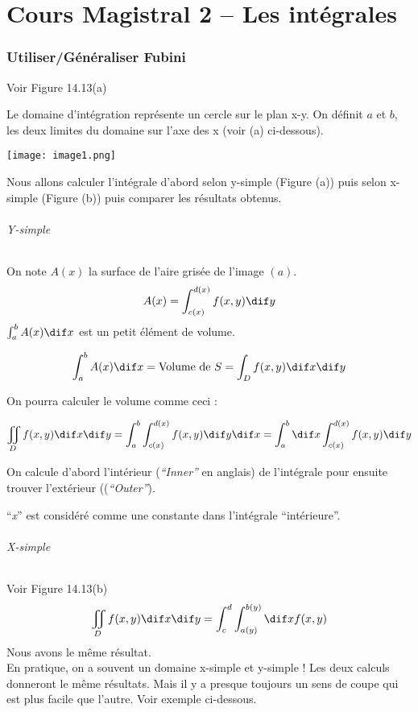 \part{Cours Magistral 2 -- Les intégrales}
\section{Utiliser/Généraliser Fubini}
Voir Figure 14.13(a)

Le domaine d'intégration représente un cercle sur le plan x-y. On définit $a$ et $b$, les deux limites du domaine sur l'axe des x (voir (a) ci-dessous).

\texttt{[image: image1.png]}

Nous allons calculer l'intégrale d'abord selon y-simple (Figure (a)) puis selon x-simple (Figure (b)) puis comparer les résultats obtenus.
\paragraph{Y-simple}
On note $A(x)$ la surface de l'aire grisée de l'image $(a)$.
\[A(x)=\int_{c(x)}^{d(x)}f(x,y)\dif y\]
$\int_a^b A(x) \dif x$ est un petit élément de volume.

\[\int_a^b A(x) \dif x = \text{Volume de }S = \int_Df(x,y) \dif x \dif y\]

On pourra calculer le volume comme ceci :

\[ \iint_D f(x,y) \dif x \dif y = \int_a^b \int_{c(x)}^{d(x)} f(x,y)  \dif y \dif x = \int_a^b \dif x \int_{c(x)}^{d(x)} f(x,y) \dif y \]

On calcule d'abord l'intérieur (\textit{``Inner''} en anglais) de l'intégrale pour ensuite trouver l'extérieur ((\textit{``Outer''}).
\begin{myrem}
``\emph{x}'' est considéré comme une constante dans l'intégrale ``intérieure''.
\end{myrem}

\paragraph{X-simple}

Voir Figure 14.13(b)
\[\iint_D f(x,y) \dif x \dif y = \int_c^d\int_{a(y)}^{b(y)} \dif x f(x,y)\]
Nous avons le même résultat.\\
En pratique, on a souvent un domaine x-simple et y-simple ! Les deux calculs donneront le même résultats. Mais il y a presque toujours un sens de coupe qui est plus facile que l'autre. Voir exemple ci-dessous.

